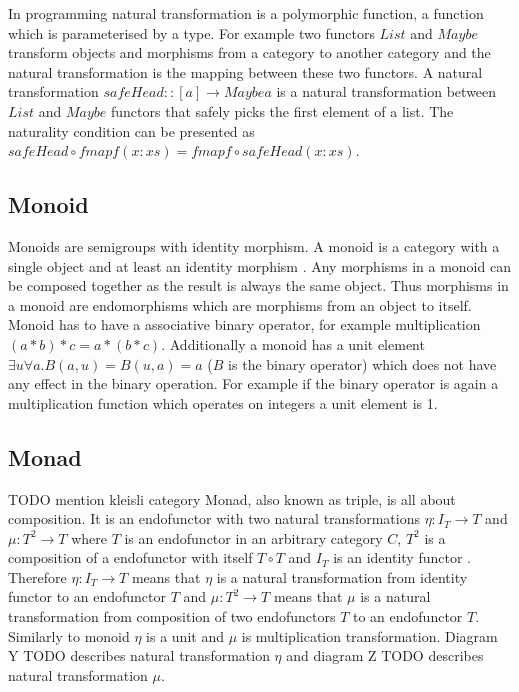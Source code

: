 \documentclass[article]{aaltoseries}
\begin{document}
    In programming natural transformation is a polymorphic function, a function
    which is parameterised by a type. For example two functors $List$ and
    $Maybe$ transform objects and morphisms from a category to another category and
    the natural transformation is the mapping between these two functors. A natural
    transformation $safeHead :: [a] \rightarrow Maybe a$ is a natural transformation between
    $List$ and $Maybe$ functors that safely picks the first element of a list. The
    naturality condition can be presented as $safeHead \circ fmap f (x:xs) = fmap f \circ
    safeHead (x:xs)$.

    
  \subsection{Monoid}
    Monoids are semigroups with identity morphism. A monoid is a category with a
    single object and at least an identity morphism \cite{barr1990category,
      awodey2006category, mac2013categories}. Any morphisms in a monoid can be
    composed together as the result is always the same object. Thus morphisms in
    a monoid are endomorphisms which are morphisms from an object to itself.
    Monoid has to have a associative binary operator, for example multiplication
    $(a * b) * c = a * (b * c)$. Additionally a monoid has a unit element
    $\exists u \forall a. B(a,u) = B(u,a) = a$ ($B$ is the binary operator) which does not have any
    effect in the binary operation. For example if the binary operator is again
    a multiplication function which operates on integers a unit element is 1.


  \subsection{Monad}
    TODO mention kleisli category
    Monad, also known as triple, is all about composition. It is an endofunctor with
    two natural transformations $\eta : I_T \rightarrow T$ and $\mu : T^2 \rightarrow T$ where $T$ is an endofunctor in
    an arbitrary category $C$, $T^2$ is a composition of a endofunctor with itself $T \circ T$
    and $I_T$ is an identity functor \cite{barr1990category, moggi1989computational}.
    Therefore $\eta : I_T \rightarrow T$ means that $\eta$ is a natural transformation from identity
    functor to an endofunctor $T$ and $\mu : T^2 \rightarrow T$ means that $\mu$ is a natural
    transformation from composition of two endofunctors $T$ to an endofunctor $T$.
    Similarly to monoid $\eta$ is a unit and $\mu$ is multiplication transformation. Diagram
    Y TODO describes natural transformation $\eta$ and diagram Z TODO describes natural
    transformation $\mu$.
    
\end{document}
